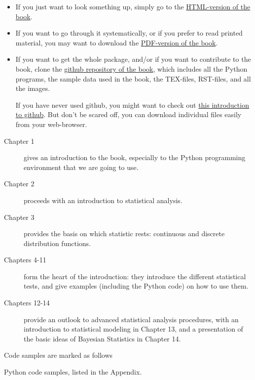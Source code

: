 \begin{itemize}
  \item If you just want to look something up, simply go to the \href{http://work.thaslwanter.at/Stats/html} {HTML-version of the book}.

  \item If you want to go through it systematically, or if you prefer to read
   printed material, you may want to download the \href{http://work.thaslwanter.at/Stats/StatsIntro.pdf} {PDF-version of the book}.

  \item If you want to get the whole package, and/or if you want to
   contribute to the book, clone the  \href{https://github.com/thomas-haslwanter/statsintro} {github repository of the
   book}, which  includes all the Python programs, the sample data used in the book,
   the TEX-files, RST-files, and all the images.

   If you have never used github, you might want to check out \href{https://help.github.com/articles/set-up-git} {this
   introduction to  github}. But don't be  scared off, you can download individual files easily from your
   web-browser.

\end{itemize}

\begin{description}
  \item[Chapter 1] gives an introduction to the book, especially to the Python programming environment that we are going to use.
  \item[Chapter 2] proceeds with an introduction to statistical analysis.
  \item[Chapter 3] provides the basis on which statistic rests: continuous and discrete distribution functions.
  \item[Chapters 4-11] form the heart of the introduction: they introduce the different statistical tests, and give examples (including the Python code) on how to use them.
  \item[Chapters 12-14] provide an outlook to advanced statistical analysis procedures, with an introduction to statistical modeling in Chapter 13, and a presentation of the basic ideas of Bayesian Statistics in Chapter 14.
\end{description}

Code samples are marked as follows

     Python code samples, listed in the Appendix.

